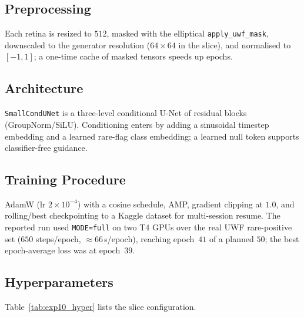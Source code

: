 \documentclass[journal,twoside,web]{ieeecolor}
\begin{document}
\subsection{Preprocessing}
Each retina is resized to $512$, masked with the elliptical
\texttt{apply\_uwf\_mask}, downscaled to the generator resolution ($64\times64$ in
the slice), and normalised to $[-1,1]$; a one-time cache of masked tensors speeds
up epochs.

\subsection{Architecture}
\texttt{SmallCondUNet} is a three-level conditional U-Net of residual blocks
(GroupNorm/SiLU). Conditioning enters by adding a sinusoidal timestep embedding and
a learned rare-flag class embedding; a learned null token supports classifier-free
guidance.

\subsection{Training Procedure}
AdamW (lr $2\times10^{-4}$) with a cosine schedule, AMP, gradient clipping at $1.0$,
and rolling/best checkpointing to a Kaggle dataset for multi-session resume. The
reported run used \texttt{MODE=full} on two T4 GPUs over the real UWF rare-positive
set ($650$ steps/epoch, $\approx66$\,s/epoch), reaching epoch~$41$ of a planned
$50$; the best epoch-average loss was at epoch~$39$.

\subsection{Hyperparameters}
Table~\ref{tab:exp10_hyper} lists the slice configuration.
\end{document}
